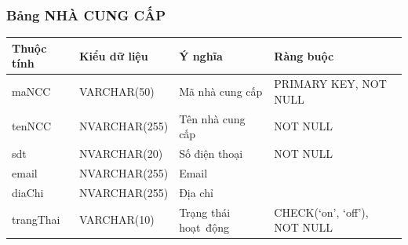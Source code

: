 \documentclass[a4paper,12pt]{report}
\begin{document}
\subsubsection{Bảng NHÀ CUNG CẤP}
\noindent
\begin{center}
    \begin{tabular}{|>{\centering\arraybackslash}p{3cm}|
        >{\centering\arraybackslash}p{4cm}|
        >{\centering\arraybackslash}p{4cm}|
        >{\centering\arraybackslash}p{4cm}|}
        \hline
        \textbf{Thuộc tính}                                                                                                               &
        \textbf{Kiểu dữ liệu}                                                                                                                             &
        \textbf{Ý nghĩa}                                                                                                 &
        \textbf{Ràng buộc}                                                                                                         \\
        \hline
        maNCC &  VARCHAR(50)  & Mã nhà cung cấp & PRIMARY KEY, NOT NULL \\
        \hline
        tenNCC &  NVARCHAR(255)  & Tên nhà cung cấp & NOT NULL \\                                                                                                                          
        \hline
        sdt & NVARCHAR(20) & Số điện thoại & NOT NULL \\                                                                                                                          
        \hline
        email & NVARCHAR(255) & Email &  \\                                                                                                                          
        \hline
        diaChi & NVARCHAR(255) & Địa chỉ & \\                                                                                                                          
        \hline
        trangThai &  VARCHAR(10)  & Trạng thái hoạt~động & CHECK(‘on’, ‘off’), NOT NULL \\
        \hline
    \end{tabular}
\end{center}
\end{document}
